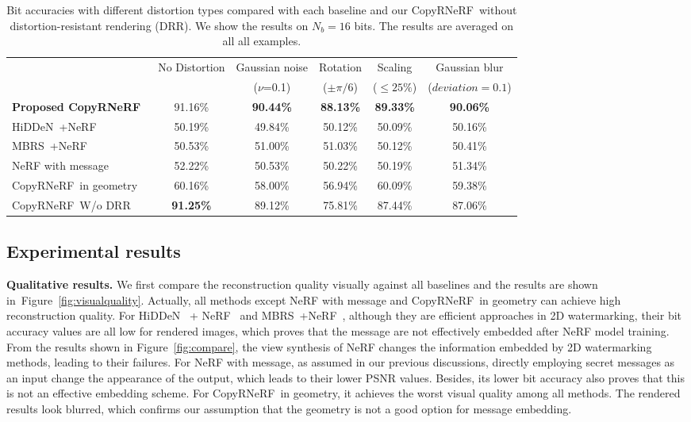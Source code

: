 \documentclass[10pt,twocolumn,letterpaper]{article}
\newcommand{\Fref}[1]{Figure~\ref{#1}}
\def\CopyNeRF{CopyRNeRF~}
\begin{document}
\begin{table}[!htb]
 \caption{Bit accuracies with different distortion types compared with each baseline and our \CopyNeRF without distortion-resistant rendering (DRR).  We show the results on $N_b = 16$ bits. The results are averaged on all all examples.}
 \label{tab:comparison3}
 \centering
 \begin{tabular}{l|ccccc}
    \toprule
         & No Distortion & Gaussian noise  & Rotation  & Scaling & Gaussian blur\\
         & & ($\nu$=0.1) & ($\pm\pi/6$) & ($\le25\%$) & ($deviation = 0.1$) \\
    \midrule
    \textbf{Proposed \CopyNeRF} &91.16\% & \textbf{90.44\%}  & \textbf{88.13\%} & \textbf{89.33\%} &  \textbf{90.06\%}   \\
    HiDDeN~\cite{zhu2018hidden}+NeRF\cite{nerf2020} & 50.19\% & 49.84\% & 50.12\% & 50.09\% &  50.16\%    \\
    MBRS~\cite{jia2021mbrs}+NeRF~\cite{nerf2020} &  50.53\% & 51.00\%  & 51.03\% & 50.12\% & 50.41\% \\
    NeRF with message & 52.22\%  & 50.53\%       & 50.22\%  & 50.19\% & 51.34\%\\
    \CopyNeRF in geometry &   60.16\% & 58.00\% &56.94\%  & 60.09\% & 59.38\%\\
    \CopyNeRF W/o DRR & \textbf{91.25\%}  & 89.12\%  & 75.81\%  & 87.44\% & 87.06\%\\
    \bottomrule
\end{tabular}
\vspace{-5pt}
 \label{tab:distortion}
 \end{table}



\subsection{Experimental results}
\noindent\textbf{Qualitative results.}
\label{sec:qualitativeresults}
We first compare the reconstruction quality visually against all baselines and the results are shown in~\Fref{fig:visualquality}. Actually, all methods except NeRF with message and \CopyNeRF in geometry can achieve high reconstruction quality. For HiDDeN~\cite{zhu2018hidden} + NeRF~\cite{nerf2020} and MBRS~\cite{jia2021mbrs}+NeRF~\cite{nerf2020}, although they are efficient approaches in 2D watermarking, their bit accuracy values are all low for rendered images, which proves that the message are not effectively embedded after NeRF model training. From the results shown in \Fref{fig:compare}, the view synthesis of NeRF changes the information embedded by 2D watermarking methods, leading to their failures. For NeRF with message, as assumed in our previous discussions, directly employing secret messages as an input change the appearance of the output, which leads to their lower PSNR values. Besides, its lower bit accuracy also proves that this is not an effective embedding scheme. For \CopyNeRF in geometry, it achieves the worst visual quality among all methods. The rendered results look blurred, which confirms our assumption that the geometry is not a good option for message embedding. 
\end{document}
